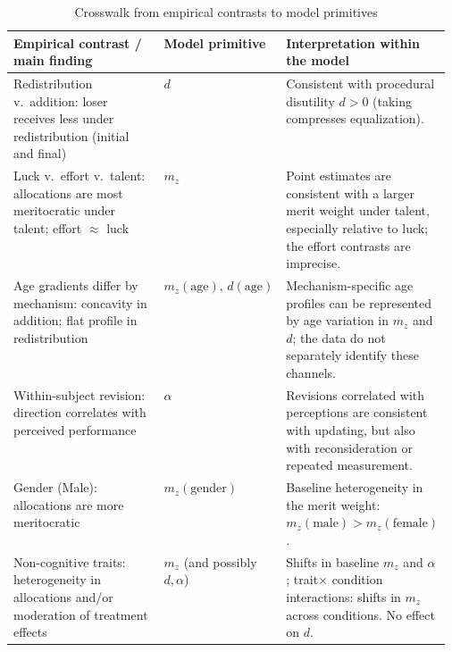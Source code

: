 \documentclass[11pt]{article}
\begin{document}
\begin{table}[htpb]
\footnotesize
\caption{Crosswalk from empirical contrasts to model primitives}
\label{tab:crosswalk}
\hspace*{-6mm}\begin{tabularx}{1.10\linewidth}{p{0.42\linewidth} p{0.15\linewidth} X}
\toprule
\textbf{Empirical contrast / main finding} &
\textbf{Model \quad primitive} &
\textbf{Interpretation within the model} \\
\midrule

Redistribution v.\ addition: loser receives less under redistribution (initial and final)  &
$d$ &
Consistent with procedural disutility $d>0$ (taking compresses equalization).\medskip \\ 

Luck v.\ effort v.\ talent: allocations are most meritocratic under talent; effort $\approx$ luck &
$m_z$ &
Point estimates are consistent with a larger merit weight under talent, especially relative to luck; the effort contrasts are imprecise.\medskip\\

Age gradients differ by mechanism: concavity in addition; flat profile in redistribution &
$m_z(\text{age}),\, d(\text{age})$ &
Mechanism-specific age profiles can be represented by age variation in $m_z$ and $d$; the data do not separately identify these channels.\medskip\\

Within-subject revision: direction correlates with perceived performance &
$\alpha$ &
Revisions correlated with perceptions are consistent with updating, but also with reconsideration or repeated measurement.\medskip\\

Gender (Male): allocations are more meritocratic 
& $m_z(\text{gender})$ 
& Baseline heterogeneity in the merit weight: $m_z(\text{male}) > m_z(\text{female})$.\medskip\\



Non-cognitive traits: heterogeneity in allocations and/or moderation of treatment effects &
$m_z$ (and possibly $d,\alpha$) &
Shifts in baseline $m_z$ and $\alpha$; trait$\times$ condition interactions: shifts in $m_z$ across conditions. No effect on $d$.\medskip\\

\bottomrule
\end{tabularx}
\end{table}
\end{document}

